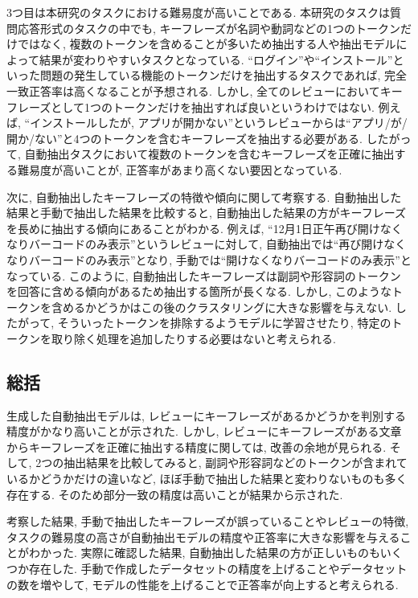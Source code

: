 3つ目は本研究のタスクにおける難易度が高いことである. 本研究のタスクは質問応答形式のタスクの中でも, キーフレーズが名詞や動詞などの1つのトークンだけではなく, 複数のトークンを含めることが多いため抽出する人や抽出モデルによって結果が変わりやすいタスクとなっている. 
``ログイン''や``インストール''といった問題の発生している機能のトークンだけを抽出するタスクであれば, 完全一致正答率は高くなることが予想される. しかし, 全てのレビューにおいてキーフレーズとして1つのトークンだけを抽出すれば良いというわけではない. 
例えば, ``インストールしたが, アプリが開かない''というレビューからは``アプリ/が/開か/ない''と4つのトークンを含むキーフレーズを抽出する必要がある. 
したがって, 自動抽出タスクにおいて複数のトークンを含むキーフレーズを正確に抽出する難易度が高いことが, 正答率があまり高くない要因となっている. 

次に, 自動抽出したキーフレーズの特徴や傾向に関して考察する. 
自動抽出した結果と手動で抽出した結果を比較すると, 自動抽出した結果の方がキーフレーズを長めに抽出する傾向にあることがわかる. 
例えば, ``12月1日正午再び開けなくなりバーコードのみ表示''というレビューに対して, 自動抽出では``再び開けなくなりバーコードのみ表示''となり, 手動では``開けなくなりバーコードのみ表示''となっている. 
このように, 自動抽出したキーフレーズは副詞や形容詞のトークンを回答に含める傾向があるため抽出する箇所が長くなる. しかし, このようなトークンを含めるかどうかはこの後のクラスタリングに大きな影響を与えない. したがって, そういったトークンを排除するようモデルに学習させたり, 特定のトークンを取り除く処理を追加したりする必要はないと考えられる. 


\subsection{総括}
生成した自動抽出モデルは, レビューにキーフレーズがあるかどうかを判別する精度がかなり高いことが示された. 
しかし, レビューにキーフレーズがある文章からキーフレーズを正確に抽出する精度に関しては, 改善の余地が見られる. そして, 2つの抽出結果を比較してみると, 副詞や形容詞などのトークンが含まれているかどうかだけの違いなど, ほぼ手動で抽出した結果と変わりないものも多く存在する. そのため部分一致の精度は高いことが結果から示された. 

考察した結果, 手動で抽出したキーフレーズが誤っていることやレビューの特徴, タスクの難易度の高さが自動抽出モデルの精度や正答率に大きな影響を与えることがわかった. 実際に確認した結果, 自動抽出した結果の方が正しいものもいくつか存在した. 
手動で作成したデータセットの精度を上げることやデータセットの数を増やして, モデルの性能を上げることで正答率が向上すると考えられる. 

